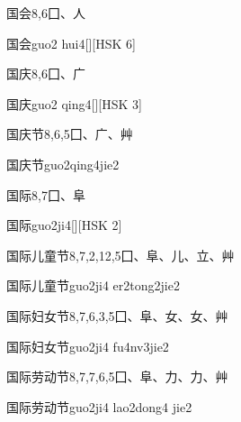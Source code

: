 \begin{entry}{国会}{8,6}{⼞、⼈}
  \begin{phonetics}{国会}{guo2 hui4}[][HSK 6]
  \end{phonetics}
\end{entry}

\begin{entry}{国庆}{8,6}{⼞、⼴}
  \begin{phonetics}{国庆}{guo2 qing4}[][HSK 3]
  \end{phonetics}
\end{entry}

\begin{entry}{国庆节}{8,6,5}{⼞、⼴、⾋}
  \begin{phonetics}{国庆节}{guo2qing4jie2}
  \end{phonetics}
\end{entry}

\begin{entry}{国际}{8,7}{⼞、⾩}
  \begin{phonetics}{国际}{guo2ji4}[][HSK 2]
  \end{phonetics}
\end{entry}

\begin{entry}{国际儿童节}{8,7,2,12,5}{⼞、⾩、⼉、⽴、⾋}
  \begin{phonetics}{国际儿童节}{guo2ji4 er2tong2jie2}
  \end{phonetics}
\end{entry}

\begin{entry}{国际妇女节}{8,7,6,3,5}{⼞、⾩、⼥、⼥、⾋}
  \begin{phonetics}{国际妇女节}{guo2ji4 fu4nv3jie2}
  \end{phonetics}
\end{entry}

\begin{entry}{国际劳动节}{8,7,7,6,5}{⼞、⾩、⼒、⼒、⾋}
  \begin{phonetics}{国际劳动节}{guo2ji4 lao2dong4 jie2}
  \end{phonetics}
\end{entry}


